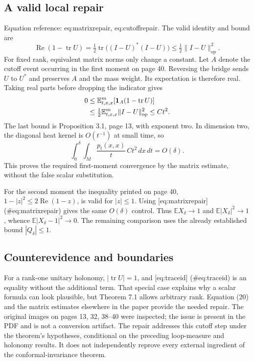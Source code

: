 \documentclass[10pt]{article}
\begin{document}
\subsection*{A valid local repair}
Equation reference: eq:matrixrepair, eq:cutoffrepair. The valid identity and bound are \[
 \operatorname{Re}(1-\operatorname{tr}U)
 =\tfrac12\operatorname{tr}\bigl((I-U)^*(I-U)\bigr)
 \leq\tfrac12\|I-U\|_{\mathrm{op}}^2.\] For fixed rank, equivalent matrix norms only change a constant. Let \(A\) denote the cutoff event occurring in the first moment on page 40. Reversing the bridge sends \(U\) to \(U^*\) and preserves \(A\) and the mass weight. Its expectation is therefore real. Taking real parts before dropping the indicator gives \[\begin{aligned}
 0&\leq \mathbb E^m_{t,x,x}
       [\mathbf1_A(1-\operatorname{tr}U)]\notag\\
  &\leq\tfrac12\mathbb E^m_{t,x,x}\|I-U\|_{\mathrm{op}}^2
   \leq Ct^2. \end{aligned}\] The last bound is Proposition 3.1, page 13, with exponent two. In dimension two, the diagonal heat kernel is \(O(t^{-1})\) at small time, so \[\int_0^\delta\!\int_M
       \frac{p_t(x,x)}{t}\,Ct^2\,dx\,dt=O(\delta).\] This proves the required first-moment convergence by the matrix estimate, without the false scalar substitution.\par
For the second moment the inequality printed on page 40, \(1-|z|^2\leq2\operatorname{Re}(1-z)\), is valid for \(|z|\leq1\). Using [eq:matrixrepair] (\#eq:matrixrepair) gives the same \(O(\delta)\) control. Thus \(\mathbb EX_\delta\to1\) and \(\mathbb E|X_\delta|^2\to1\), whence \(\mathbb E|X_\delta-1|^2\to0\). The remaining comparison uses the already established bound \(|Q_\delta|\leq1\).\par
\subsection*{Counterevidence and boundaries}
For a rank-one unitary holonomy, \(|\operatorname{tr}U|=1\), and [eq:traceid] (\#eq:traceid) is an equality without the additional term. That special case explains why a scalar formula can look plausible, but Theorem 7.1 allows arbitrary rank. Equation (20) and the matrix estimates elsewhere in the paper provide the needed repair. The original images on pages 13, 32, 38–40 were inspected; the issue is present in the PDF and is not a conversion artifact. The repair addresses this cutoff step under the theorem’s hypotheses, conditional on the preceding loop-measure and holonomy results. It does not independently reprove every external ingredient of the conformal-invariance theorem.\par
\end{document}
